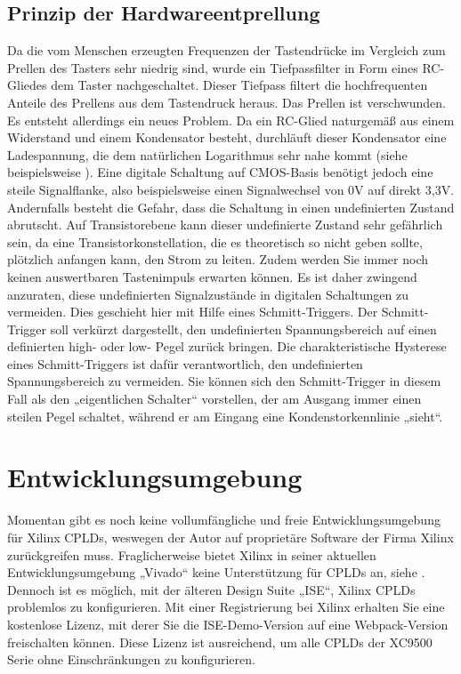\documentclass{article}
\begin{document}
\subsection{Prinzip der Hardwareentprellung}
Da die vom Menschen erzeugten Frequenzen der Tastendrücke im Vergleich zum Prellen des Tasters sehr niedrig sind, wurde ein Tiefpassfilter in Form eines RC-Gliedes dem Taster nachgeschaltet. 
Dieser Tiefpass filtert die hochfrequenten Anteile des Prellens aus dem Tastendruck heraus. Das Prellen ist verschwunden. Es entsteht allerdings ein neues Problem. Da ein RC-Glied naturgemäß aus einem Widerstand und einem Kondensator besteht, durchläuft dieser Kondensator eine Ladespannung, die dem natürlichen Logarithmus sehr nahe kommt (siehe beispielsweise \autocite{RC}). Eine digitale Schaltung auf CMOS-Basis benötigt jedoch eine steile Signalflanke, also beispielsweise einen Signalwechsel von 0V auf direkt 3,3V. Andernfalls besteht die Gefahr, dass die Schaltung in einen undefinierten Zustand abrutscht. Auf Transistorebene kann dieser undefinierte Zustand sehr gefährlich sein, da eine Transistorkonstellation, die es theoretisch so nicht geben sollte, plötzlich anfangen kann, den Strom zu leiten. Zudem werden Sie immer noch keinen auswertbaren Tastenimpuls erwarten können. Es ist daher zwingend anzuraten, diese undefinierten Signalzustände in digitalen Schaltungen zu vermeiden. Dies geschieht hier mit Hilfe eines Schmitt-Triggers. Der Schmitt-Trigger soll verkürzt dargestellt, den undefinierten Spannungsbereich auf einen definierten high- oder low- Pegel zurück bringen. Die charakteristische Hysterese eines Schmitt-Triggers ist dafür verantwortlich, den undefinierten Spannungsbereich zu vermeiden. Sie können sich den Schmitt-Trigger in diesem Fall als den „eigentlichen Schalter“ vorstellen, der am Ausgang immer einen steilen Pegel schaltet, während er am Eingang eine Kondenstorkennlinie „sieht“.


\section{Entwicklungsumgebung}

Momentan gibt es noch keine vollumfängliche und freie \autocite{FSF} Entwicklungsumgebung für Xilinx CPLDs, weswegen der Autor auf proprietäre Software der Firma Xilinx zurückgreifen muss.
Fraglicherweise bietet Xilinx in seiner aktuellen Entwicklungsumgebung „Vivado“ keine Unterstützung für CPLDs an, siehe \autocite[17]{Vivado}. Dennoch ist es möglich, mit der älteren Design Suite „ISE“, Xilinx CPLDs problemlos zu konfigurieren.
Mit einer Registrierung bei Xilinx erhalten Sie eine kostenlose Lizenz, mit derer Sie die ISE-Demo-Version auf eine Webpack-Version \autocite{ISE-Web} freischalten können. Diese Lizenz ist ausreichend, um alle CPLDs der XC9500 Serie ohne Einschränkungen zu konfigurieren.
\end{document}
